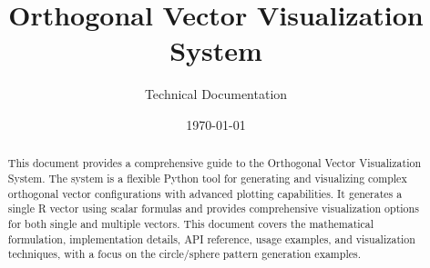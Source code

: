 \documentclass{article}
\title{Orthogonal Vector Visualization System}
\author{Technical Documentation}
\date{\today}
\begin{document}
\maketitle

\begin{abstract}
This document provides a comprehensive guide to the Orthogonal Vector Visualization System. The system is a flexible Python tool for generating and visualizing complex orthogonal vector configurations with advanced plotting capabilities. It generates a single R vector using scalar formulas and provides comprehensive visualization options for both single and multiple vectors. This document covers the mathematical formulation, implementation details, API reference, usage examples, and visualization techniques, with a focus on the circle/sphere pattern generation examples.
\end{abstract}

\tableofcontents
\newpage














\appendix




\end{document}

